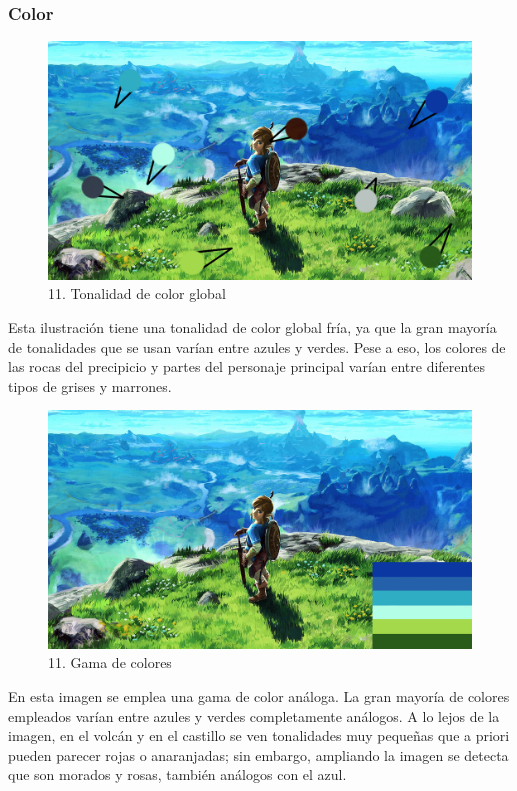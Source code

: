 \documentclass[12pt]{article}
\begin{document}
      \subsubsection{Color}
  \begin{figure}[H]
    \centering
    \includegraphics[width=\textwidth]{images/Carlos/15/Tonalidad.jpg}
    \caption{\small 11. Tonalidad de color global}
  \end{figure}
  Esta ilustración tiene una tonalidad de color global fría, ya que la gran mayoría de tonalidades que se usan varían entre azules y verdes. Pese a eso, los colores de las rocas del precipicio y partes del personaje principal varían entre diferentes tipos de grises y marrones.

  \begin{figure}[H]
    \centering
    \includegraphics[width=\textwidth]{images/Carlos/15/Gamma.jpg}
    \caption{\small 11. Gama de colores}
  \end{figure}
  En esta imagen se emplea una gama de color análoga. La gran mayoría de colores empleados varían entre azules y verdes completamente análogos. A lo lejos de la imagen, en el volcán y en el castillo se ven tonalidades muy pequeñas que a priori pueden parecer rojas o anaranjadas; sin embargo, ampliando la imagen se detecta que son morados y rosas, también análogos con el azul.
\end{document}
